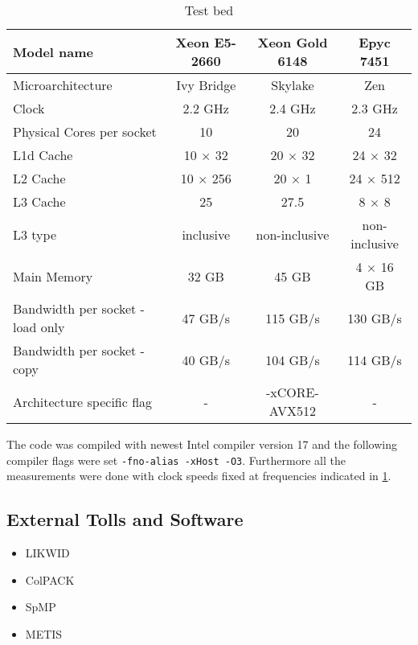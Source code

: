 \begin{table}[tbhp]
\footnotesize
\caption{Test bed}\label{tab:test_bed}
\begin{center}
	\begin{tabular}{|l| c  c c |}
		\toprule
		{Model name} & {Xeon\textsuperscript{\textregistered} E5-2660} & {Xeon\textsuperscript{\textregistered} Gold 6148} & { Epyc 7451 } \\
		\midrule
		{Microarchitecture} & {Ivy Bridge} & {Skylake} & {Zen} \\
		\midrule
		{Clock} & {2.2 GHz} & {2.4 GHz} & {2.3 GHz}\\
		{Physical Cores per socket} & {10} & {20} & {24}\\
		{L1d Cache} & {10 $\times$ 32 \KB} & {20 $\times$ 32 \KB} & {24 $\times$  32 \KB}\\
		{L2 Cache} & {10 $\times$ 256 \KB} & {20 $\times$ 1 \MB} & {24 $\times$ 512 \MB }\\
		{L3 Cache} & {25 \MB} & {27.5 \MB} & {8 $\times$ 8 \MB}\\
		{L3 type} & {inclusive} & {non-inclusive} & {non-inclusive}\\
		{Main Memory} & {32 GB} & {45 GB} & {4 $\times$ 16 GB}\\
		{Bandwidth per socket - load only} & {47 GB/s} & {115 GB/s} & {130 GB/s }\\ %
		{Bandwidth per socket - copy} & {40 GB/s} & {104 GB/s} & {114 GB/s }\\
		{Architecture specific flag} & {-} & {-xCORE-AVX512} & {-}\\
		\bottomrule
	\end{tabular}
\end{center}
\end{table} 

The code was compiled with newest Intel compiler version 17 and the following compiler flags were set {\tt -fno-alias -xHost -O3}. Furthermore all the measurements were done with  \CPU clock speeds fixed at frequencies indicated in \cref{tab:test_bed}.

\subsection{External Tolls and Software}
\begin{itemize}
	\item LIKWID
	\item ColPACK
	\item SpMP
	\item METIS
\end{itemize}

